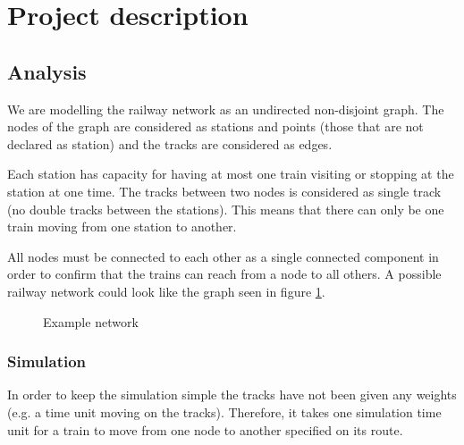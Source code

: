 \documentclass[10pt,a4paper]{article}
\begin{document}
\section{Project description}

\subsection{Analysis}
We are modelling the railway network as an undirected non-disjoint graph. The nodes of the graph are considered as stations and points (those that are not declared as station) and the tracks are considered as edges.
 
Each station has capacity for having at most one train visiting or stopping at the station at one time.
The tracks between two nodes is considered as single track (no double tracks between the stations). This means that there can only be one train moving from one station to another.  
 
All nodes must be connected to each other as a single connected component in order to confirm that the trains can reach from a node to all others.  A possible railway network could look like the graph seen in figure \ref{fig:graph}.

\begin{figure}[h]
\centering
{}
 \caption{Example network}

 \label{fig:graph}
\end{figure}

\subsubsection{Simulation}
 
In order to keep the simulation simple the tracks have not been given any weights (e.g. a time unit moving on the tracks). Therefore, it takes one simulation time unit for a train to move from one node to another specified on its route.
 
\end{document}
